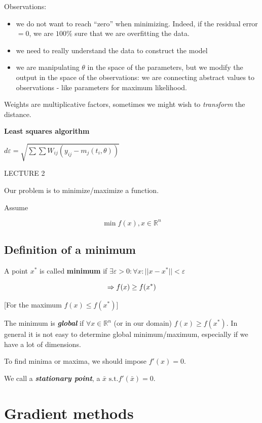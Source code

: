 Observations:

\begin{itemize}
\tightlist
\item
  we do not want to reach ``zero'' when minimizing. Indeed, if the
  residual error $=0$, we are $100 \%$ sure that we are overfitting the
  data.
\item
  we need to really understand the data to construct the model
\item
  we are manipulating $\theta$ in the space of the parameters, but we
  modify the output in the space of the observations: we are connecting
  abstract values to observations - like parameters for maximum
  likelihood.
\end{itemize}

Weights are multiplicative factors, sometimes we might wish to
\emph{transform} the distance.

\textbf{Least squares algorithm}

$d{\varepsilon}=\sqrt{\sum \sum W_{ij}\left(y_{ij}-m_j\left(t_i, \theta\right)\right)}$

LECTURE 2

Our problem is to minimize/maximize a function.

Assume

$$
\min f(x), x \in \mathbb{R}^n
$$

\hypertarget{definition-of-a-minimum}{%
\subsection{Definition of a minimum}\label{definition-of-a-minimum}}

A point $x^*$ is called \textbf{minimum} if
$\exists \varepsilon > 0 : \forall x : || x- x^* || < \varepsilon$

$$
\Rightarrow f(x) \geq f(x^*) \\ 
$$

{[}For the maximum $f(x) \leq f(x^*)${]}

The minimum is \textbf{\emph{global}} if $\forall x \in \mathbb{R}^n$
(or in our domain) $f(x) \geq f(x^*)$. In general it is not easy to
determine global minimum/maximum, especially if we have a lot of
dimensions.

To find minima or maxima, we should impose $f'(x)=0$.

We call a \textbf{\emph{stationary point}}, a
$\bar{x} \text{ s.t.} f'(\bar{x})=0$.

\hypertarget{gradient-methods}{%
\section{Gradient methods}\label{gradient-methods}}

